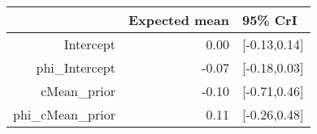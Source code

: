 \begin{tabular}{rrl}
  \hline
 & Expected mean & 95\% CrI \\ 
  \hline
Intercept & 0.00 & [-0.13,0.14] \\ 
  phi\_Intercept & -0.07 & [-0.18,0.03] \\ 
  cMean\_prior & -0.10 & [-0.71,0.46] \\ 
  phi\_cMean\_prior & 0.11 & [-0.26,0.48] \\ 
   \hline
\end{tabular}

